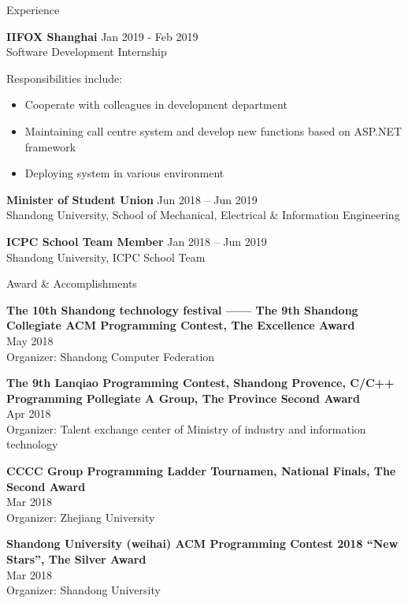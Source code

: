 \documentclass{resume} %
\begin{document}
\begin{rSection}{Experience}

{\bf IIFOX Shanghai} \hfill {Jan 2019 - Feb 2019}\\
{Software Development Internship}

Responsibilities include:
\begin{itemize}
	\item Cooperate with colleagues in development department
	\item Maintaining call centre system and develop new functions based on ASP.NET framework
	\item Deploying system in various environment
\end{itemize}
 
{\bf Minister of Student Union} \hfill {Jun 2018 – Jun 2019}\\
{Shandong University, School of Mechanical, Electrical \& Information Engineering}

{\bf ICPC School Team Member} \hfill {Jan 2018 – Jun 2019}\\
{Shandong University, ICPC School Team}

\end{rSection}

\begin{rSection}{Award \& Accomplish­ments}
 
{\bf The 10th Shandong technology festival —— The 9th Shandong Collegiate ACM Programming Contest, The Excellence Award}\\ \hfill {May 2018}\\
{Organizer: Shandong Computer Federation}

{\bf The 9th Lanqiao Programming Contest, Shandong Provence, C/C++ Programming Pollegiate A Group, The Province Second Award}\\ \hfill {Apr 2018}\\
{Organizer: Talent exchange center of Ministry of industry and information technology}

{\bf CCCC Group Programming Ladder Tournamen, National Finals, The Second Award}\\ \hfill {Mar 2018}\\
{Organizer: Zhejiang University}

{\bf Shandong University (weihai) ACM Programming Contest 2018 “New Stars”, The Silver Award}\\ \hfill {Mar 2018}\\
{Organizer: Shandong University}

\end{rSection}
\end{document}
